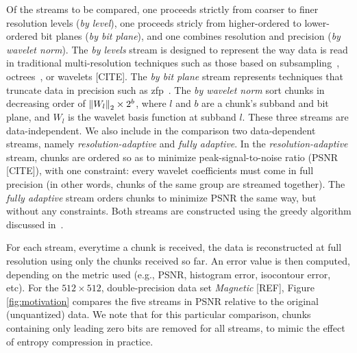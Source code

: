 Of the streams to be compared, one proceeds strictly from coarser to finer resolution levels
(\emph{by level}), one proceeds stricly from higher-ordered to lower-ordered bit planes (\emph{by
bit plane}), and one combines resolution and precision (\emph{by wavelet norm}). The \emph{by
levels} stream is designed to represent the way data is read in traditional multi-resolution
techniques such as those based on subsampling~\cite{idx2001}, octrees~\cite{multires_octree1999},
or wavelets [CITE]. The
\emph{by bit plane} stream represents techniques that truncate data in precision such as zfp~\cite{zfp2014}.
The \emph{by wavelet norm} sort chunks in decreasing order of $\left\lVert W_l\right\rVert_2 \times 2^b$, where $l$
and $b$ are a chunk's subband and bit plane, and $W_l$ is the wavelet basis function at subband $l$.
These three streams are data-independent. We also include in the comparison two data-dependent
streams, namely \emph{resolution-adaptive} and \emph{fully adaptive}. In the
\emph{resolution-adaptive} stream, chunks are ordered so as to minimize peak-signal-to-noise ratio
(PSNR [CITE]), with one constraint: every wavelet coefficients must come in full precision (in other
words, chunks of the same group are streamed together). The \emph{fully adaptive} stream orders
chunks to minimize PSNR the same way, but without any constraints. Both streams are constructed
using the greedy algorithm discussed in~.

For each stream, everytime a chunk is received, the data is reconstructed at full resolution using
only the chunks received so far. An error value is then computed, depending on the metric used
(e.g., PSNR, histogram error, isocontour error, etc). For the $512 \times 512$, double-precision
data set \emph{Magnetic} [REF], Figure \ref{fig:motivation} compares the five streams in
PSNR relative to the original (unquantized) data. We note that for this particular comparison,
chunks containing only leading zero bits are removed for all streams, to mimic the effect of entropy
compression in practice.

